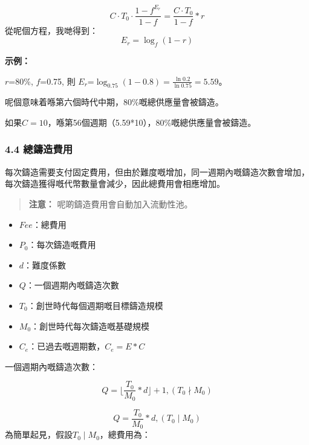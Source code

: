 \documentclass[
]{article}
\providecommand{\tightlist}{%
  \setlength{\itemsep}{0pt}\setlength{\parskip}{0pt}}
\begin{document}
\begin{equation}
C \cdot T_0 \cdot \frac{1-f^{E_r}}{1-f} = \frac{C \cdot T_0}{1-f}*r
\end{equation} 從呢個方程，我哋得到： \begin{equation}
E_r = \log_f(1-r)
\end{equation}

\textbf{示例：}

\(r\)=80\%, \(f\)=0.75, 則
\(E_r\)=\(\log_{0.75}(1-0.8)=\frac{\ln0.2}{\ln0.75}=5.59\)。

呢個意味着喺第六個時代中期，80\%嘅總供應量會被鑄造。

如果\(C=10\)，喺第56個週期（5.59*10），80\%嘅總供應量會被鑄造。

\subsubsection{4.4 總鑄造費用}\label{ux7e3dux9444ux9020ux8cbbux7528}

每次鑄造需要支付固定費用，但由於難度嘅增加，同一週期內嘅鑄造次數會增加，每次鑄造獲得嘅代幣數量會減少，因此總費用會相應增加。

\begin{quote}
\textbf{注意：} 呢啲鑄造費用會自動加入流動性池。
\end{quote}

\begin{itemize}
\tightlist
\item
  \(Fee\)：總費用
\item
  \(P_0\)：每次鑄造嘅費用
\item
  \(d\)：難度係數
\item
  \(Q\)：一個週期內嘅鑄造次數
\item
  \(T_0\)：創世時代每個週期嘅目標鑄造規模
\item
  \(M_0\)：創世時代每次鑄造嘅基礎規模
\item
  \(C_e\)：已過去嘅週期數，\(C_e = E * C\)
\end{itemize}

一個週期內嘅鑄造次數：

\begin{equation}
Q = {\lfloor{\frac{T_0}{M_0}*d}\rfloor + 1}, (T_0 \nmid M_0)
\end{equation}

\begin{equation}
Q = \frac{T_0}{M_0}*d, (T_0 \mid M_0)
\end{equation} 為簡單起見，假設\(T_0 \mid M_0\)，總費用為：
\end{document}

